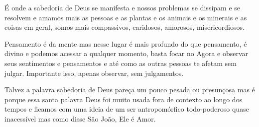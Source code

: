 É onde a sabedoria de Deus se manifesta e nossos problemas se dissipam e se resolvem e amamos mais as pessoas e as plantas e os animais e os minerais e as coisas em geral, somos mais compassivos, caridosos, amorosos, misericordiosos. 

Pensamento é da mente mas nesse lugar é mais profundo do que pensamento, é divino e podemos acessar a qualquer momento, basta focar no Agora e observar seus sentimentos e pensamentos e até como as outras pessoas te afetam sem julgar. Importante isso, apenas observar, sem julgamentos. 

Talvez a palavra sabedoria de Deus pareça um pouco pesada ou presunçosa mas é porque essa santa palavra Deus foi muito usada fora de contexto ao longo dos tempos e ficamos com uma ideia de um ser antropomórfico todo-poderoso quase inacessível mas como disse São João, Ele é Amor. 